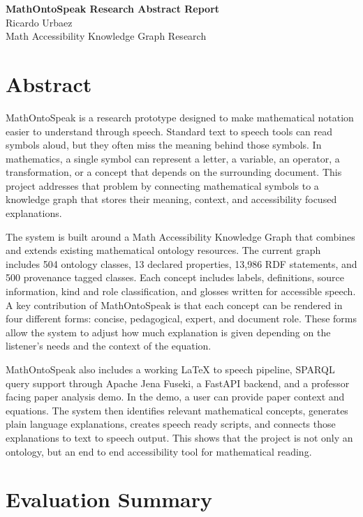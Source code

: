 \documentclass[10pt]{article}
\begin{document}
\begin{center}
{\Large \textbf{MathOntoSpeak Research Abstract Report}}\\[4pt]
{\normalsize Ricardo Urbaez}\\[2pt]
{\normalsize Math Accessibility Knowledge Graph Research}
\end{center}

\vspace{0.08in}

\section*{Abstract}

MathOntoSpeak is a research prototype designed to make mathematical notation easier to understand through speech. Standard text to speech tools can read symbols aloud, but they often miss the meaning behind those symbols. In mathematics, a single symbol can represent a letter, a variable, an operator, a transformation, or a concept that depends on the surrounding document. This project addresses that problem by connecting mathematical symbols to a knowledge graph that stores their meaning, context, and accessibility focused explanations.

The system is built around a Math Accessibility Knowledge Graph that combines and extends existing mathematical ontology resources. The current graph includes 504 ontology classes, 13 declared properties, 13,986 RDF statements, and 500 provenance tagged classes. Each concept includes labels, definitions, source information, kind and role classification, and glosses written for accessible speech. A key contribution of MathOntoSpeak is that each concept can be rendered in four different forms: concise, pedagogical, expert, and document role. These forms allow the system to adjust how much explanation is given depending on the listener's needs and the context of the equation.

MathOntoSpeak also includes a working LaTeX to speech pipeline, SPARQL query support through Apache Jena Fuseki, a FastAPI backend, and a professor facing paper analysis demo. In the demo, a user can provide paper context and equations. The system then identifies relevant mathematical concepts, generates plain language explanations, creates speech ready scripts, and connects those explanations to text to speech output. This shows that the project is not only an ontology, but an end to end accessibility tool for mathematical reading.

\section*{Evaluation Summary}
\end{document}
